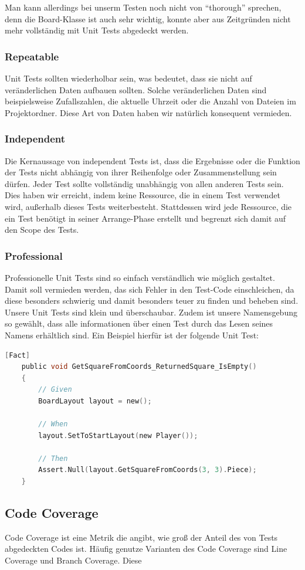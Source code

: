 \documentclass[
10pt, %
a4paper, %
oneside, %
headinclude,footinclude, %
BCOR5mm, %
]{scrartcl}
\begin{document}
\begin{onehalfspace}
Man kann allerdings bei unserm Testen noch nicht von \enquote{thorough} sprechen, denn die Board-Klasse ist auch sehr wichtig, konnte aber aus Zeitgründen nicht mehr vollständig mit Unit Tests abgedeckt werden.

\subsubsection{Repeatable}
Unit Tests sollten wiederholbar sein, was bedeutet, dass sie nicht auf veränderlichen Daten aufbauen sollten. Solche veränderlichen Daten sind beispielsweise Zufallszahlen, die aktuelle Uhrzeit oder die Anzahl von Dateien im Projektordner. Diese Art von Daten haben wir natürlich konsequent vermieden.
\subsubsection{Independent}
Die Kernaussage von independent Tests ist, dass die Ergebnisse oder die Funktion der Tests nicht abhängig von ihrer Reihenfolge oder Zusammenstellung sein dürfen. Jeder Test sollte vollständig unabhängig von allen anderen Tests sein. Dies haben wir erreicht, indem keine Ressource, die in einem Test verwendet wird, außerhalb dieses Tests weiterbesteht. Stattdessen wird jede Ressource, die ein Test benötigt in seiner Arrange-Phase erstellt und begrenzt sich damit auf den Scope des Tests.
\subsubsection{Professional}
Professionelle Unit Tests sind so einfach verständlich wie möglich gestaltet. Damit soll vermieden werden, das sich Fehler in den Test-Code einschleichen, da diese besonders schwierig und damit besonders teuer zu finden und beheben sind.
Unsere Unit Tests sind klein und überschaubar. Zudem ist unsere Namensgebung so gewählt, dass alle informationen über einen Test durch das Lesen seines Namens erhältlich sind. Ein Beispiel hierfür ist der folgende Unit Test:
\begin{lstlisting}[language=c, style=mStyle]
	[Fact]
	public void GetSquareFromCoords_ReturnedSquare_IsEmpty()
	{
		// Given
		BoardLayout layout = new();

		// When
		layout.SetToStartLayout(new Player());
		
		// Then
		Assert.Null(layout.GetSquareFromCoords(3, 3).Piece);
	}
\end{lstlisting}

\subsection{Code Coverage}
Code Coverage ist eine Metrik die angibt, wie groß der Anteil des von Tests abgedeckten Codes ist. Häufig genutze Varianten des Code Coverage sind Line Coverage und Branch Coverage. Diese 


\end{onehalfspace}
\end{document}
